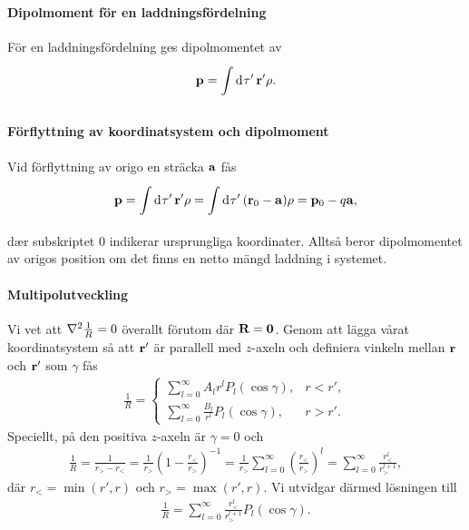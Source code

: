 \paragraph{Dipolmoment för en laddningsfördelning}
För en laddningsfördelning ges dipolmomentet av
\begin{align*}
	\vb{p} = \int\limits_{}^{}\dd[]{\tau'}\vb{r}'\rho.
\end{align*}

\paragraph{Förflyttning av koordinatsystem och dipolmoment}
Vid förflyttning av origo en sträcka $\vb{a}$ fås
\begin{align*}
	\vb{p} = \int\limits_{}^{}\dd[]{\tau'}\vb{r}'\rho = \int\limits_{}^{}\dd[]{\tau'}(\vb{r}_{0} - \vb{a})\rho = \vb{p}_{0} - q\vb{a},
\end{align*}
dær subskriptet $0$ indikerar ursprungliga koordinater. Alltså beror dipolmomentet av origos position om det finns en netto mängd laddning i systemet.

\paragraph{Multipolutveckling}
Vi vet att $\laplacian{\frac{1}{R}} = 0$ överallt förutom där $\vb{R} = \vb{0}$. Genom att lägga vårat koordinatsystem så att $\vb{r}'$ är parallell med $z$-axeln och definiera vinkeln mellan $\vb{r}$ och $\vb{r}'$ som $\gamma$ fås
\begin{align*}
	\frac{1}{R} =
	\begin{cases}
		\sum\limits_{l = 0}^{\infty}A_{l}r^{l}P_{l}(\cos{\gamma}),          &r < r', \\
		\sum\limits_{l = 0}^{\infty}\frac{B_{l}}{r^{l}}P_{l}(\cos{\gamma}), &r > r'.
	\end{cases}
\end{align*}
Speciellt, på den positiva $z$-axeln är $\gamma = 0$ och
\begin{align*}
	\frac{1}{R} = \frac{1}{r_{>} - r_{<}} = \frac{1}{r_{>}}\left(1 - \frac{r_{<}}{r_{>}}\right)^{-1} = \frac{1}{r_{>}}\sum\limits_{l = 0}^{\infty}\left(\frac{r_{<}}{r_{>}}\right)^{l} = \sum\limits_{l = 0}^{\infty}\frac{r_{<}^{l}}{r_{>}^{l + 1}},
\end{align*}
där $r_{<} = \min(r', r)$ och $r_{>} = \max(r', r)$. Vi utvidgar därmed lösningen till
\begin{align*}
	\frac{1}{R} = \sum\limits_{l = 0}^{\infty}\frac{r_{<}^{l}}{r_{>}^{l + 1}}P_{l}(\cos{\gamma}).
\end{align*}

